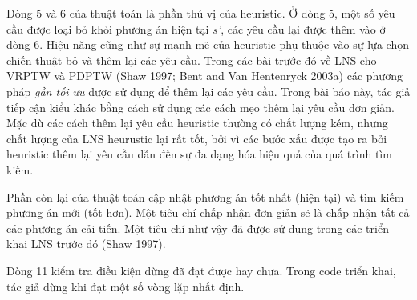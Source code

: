 Dòng 5 và 6 của thuật toán là phần thú vị của heuristic. Ở dòng 5, một số yêu cầu được loại bỏ khỏi phương án hiện tại \textit{s'}, các yêu cầu lại được thêm vào ở dòng 6. Hiệu năng cũng như sự mạnh mẽ của heuristic phụ thuộc vào sự lựa chọn chiến thuật bỏ và thêm lại các yêu cầu. Trong các bài trước đó về LNS cho VRPTW và PDPTW (Shaw 1997; Bent and Van Hentenryck 2003a) các phương pháp \textit{gần tối ưu} được sử dụng để thêm lại các yêu cầu. Trong bài báo này, tác giả tiếp cận kiểu khác bằng cách sử dụng các cách mẹo thêm lại yêu cầu đơn giản. Mặc dù các cách thêm lại yêu cầu heuristic thường có chất lượng kém, nhưng chất lượng của LNS heurustic lại rất tốt, bởi vì các bước xấu được tạo ra bởi heuristic thêm lại yêu cầu dẫn đến sự đa dạng hóa hiệu quả của quá trình tìm kiếm. 

Phần còn lại của thuật toán cập nhật phương án tốt nhất (hiện tại) và tìm kiếm phương án mới (tốt hơn). Một tiêu chí chấp nhận đơn giản sẽ là chấp nhận tất cả các phương án cải tiến. Một tiêu chí như vậy đã được sử dụng trong các triển khai LNS trước đó (Shaw 1997).

Dòng 11 kiểm tra điều kiện dừng đã đạt được hay chưa. Trong code triển khai, tác giả dừng khi đạt một số vòng lặp nhất định.


